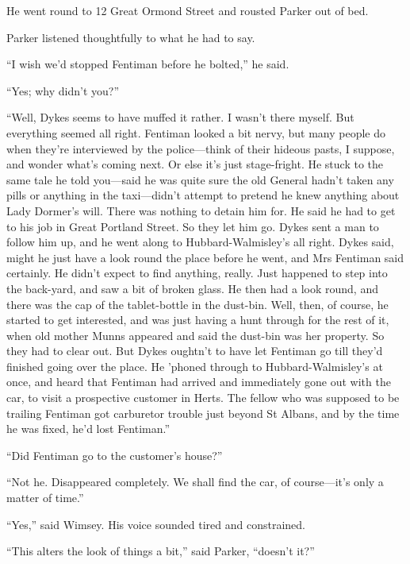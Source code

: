 He went round to 12 Great Ormond Street and rousted Parker out of bed.

Parker listened thoughtfully to what he had to say.

\enquote{I wish we'd stopped Fentiman before he bolted,} he said.

\enquote{Yes; why didn't you?}

\enquote{Well, Dykes seems to have muffed it rather. I wasn't there myself. But everything seemed all right. Fentiman looked a bit nervy, but many people do when they're interviewed by the police\allowbreak---\allowbreak think of their hideous pasts, I suppose, and wonder what's coming next. Or else it's just stage-fright. He stuck to the same tale he told you\allowbreak---\allowbreak said he was quite sure the old General hadn't taken any pills or anything in the taxi\allowbreak---\allowbreak didn't attempt to pretend he knew anything about Lady Dormer's will. There was nothing to detain him for. He said he had to get to his job in Great Portland Street. So they let him go. Dykes sent a man to follow him up, and he went along to Hubbard-Walmisley's all right. Dykes said, might he just have a look round the place before he went, and Mrs Fentiman said certainly. He didn't expect to find anything, really. Just happened to step into the back-yard, and saw a bit of broken glass. He then had a look round, and there was the cap of the tablet-bottle in the dust-bin. Well, then, of course, he started to get interested, and was just having a hunt through for the rest of it, when old mother Munns appeared and said the dust-bin was her property. So they had to clear out. But Dykes oughtn't to have let Fentiman go till they'd finished going over the place. He 'phoned through to Hubbard-Walmisley's at once, and heard that Fentiman had arrived and immediately gone out with the car, to visit a prospective customer in Herts. The fellow who was supposed to be trailing Fentiman got carburetor trouble just beyond St Albans, and by the time he was fixed, he'd lost Fentiman.}

\enquote{Did Fentiman go to the customer's house?}

\enquote{Not he. Disappeared completely. We shall find the car, of course\allowbreak---\allowbreak it's only a matter of time.}

\enquote{Yes,} said Wimsey. His voice sounded tired and constrained.

\enquote{This alters the look of things a bit,} said Parker, \enquote{doesn't it?}

